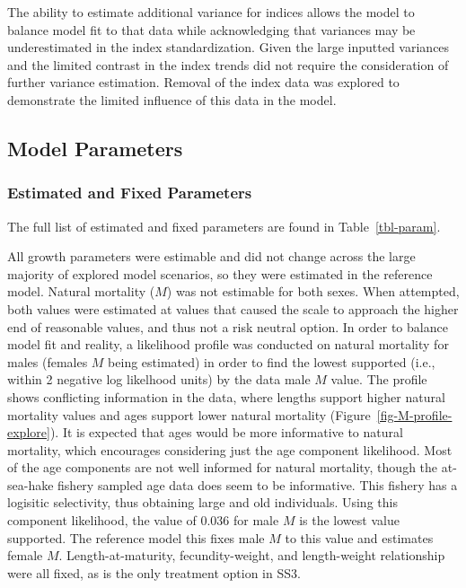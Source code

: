 \documentclass[
]{scrartcl}
\begin{document}
The ability to estimate additional variance for indices allows the model
to balance model fit to that data while acknowledging that variances may
be underestimated in the index standardization. Given the large inputted
variances and the limited contrast in the index trends did not require
the consideration of further variance estimation. Removal of the index
data was explored to demonstrate the limited influence of this data in
the model.

\subsection{Model Parameters}\label{model-parameters}

\subsubsection{Estimated and Fixed
Parameters}\label{estimated-and-fixed-parameters}

The full list of estimated and fixed parameters are found in
Table~\ref{tbl-param}.

All growth parameters were estimable and did not change across the large
majority of explored model scenarios, so they were estimated in the
reference model. Natural mortality (\(M\)) was not estimable for both
sexes. When attempted, both values were estimated at values that caused
the scale to approach the higher end of reasonable values, and thus not
a risk neutral option. In order to balance model fit and reality, a
likelihood profile was conducted on natural mortality for males (females
\(M\) being estimated) in order to find the lowest supported (i.e.,
within 2 negative log likelhood units) by the data male \(M\) value. The
profile shows conflicting information in the data, where lengths support
higher natural mortality values and ages support lower natural mortality
(Figure~\ref{fig-M-profile-explore}). It is expected that ages would be
more informative to natural mortality, which encourages considering just
the age component likelihood. Most of the age components are not well
informed for natural mortality, though the at-sea-hake fishery sampled
age data does seem to be informative. This fishery has a logisitic
selectivity, thus obtaining large and old individuals. Using this
component likelihood, the value of 0.036 for male \(M\) is the lowest
value supported. The reference model this fixes male \(M\) to this value
and estimates female \(M\). Length-at-maturity, fecundity-weight, and
length-weight relationship were all fixed, as is the only treatment
option in SS3.
\end{document}
